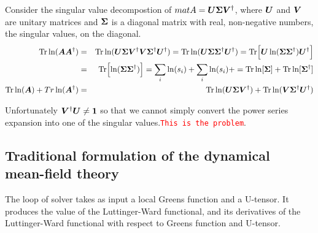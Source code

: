 \documentclass[11pt,a4paper]{report}
\newcommand{\petertt}[1]{\textcolor{red}{\texttt{#1}}}
\begin{document}
Consider the singular value decompostion of
$mat{A}=\bm{U}\bm{\Sigma}\bm{V}^\dagger$, where $\bm{U}$ and $\bm{V}$ are
unitary matrices and $\bm{\Sigma}$ is a diagonal matrix with real,
non-negative numbers, the singular values, on the diagonal.
\begin{eqnarray}
\mathrm{Tr}\ln(\bm{A}\bm{A}^\dagger)
&=&\mathrm{Tr}\ln(\bm{U}\bm{\Sigma}\bm{V}^\dagger
\bm{V}\bm{\Sigma}^\dagger\bm{U}^\dagger)
=\mathrm{Tr}\ln(\bm{U}\bm{\Sigma}\bm{\Sigma}^\dagger\bm{U}^\dagger)
=\mathrm{Tr}\Bigl[\bm{U}\ln(\bm{\Sigma}\bm{\Sigma}^\dagger)\bm{U}^\dagger\Bigr]
\nonumber\\
&=&\mathrm{Tr}\Bigl[\ln(\bm{\Sigma}\bm{\Sigma}^\dagger)\Bigr]
=\sum_i \ln(s_i)+\sum_i \ln(s_i)+
=\mathrm{Tr}\ln[\bm{\Sigma}]+\mathrm{Tr}\ln[\bm{\Sigma}^\dagger]
\nonumber\\
\mathrm{Tr}\ln(\bm{A})+Tr\ln(\bm{A}^\dagger)
&=&\mathrm{Tr}\ln(\bm{U}\bm{\Sigma}\bm{V}^\dagger)
+\mathrm{Tr}\ln(\bm{V}\bm{\Sigma}^\dagger\bm{U}^\dagger)
\end{eqnarray}

Unfortunately $\bm{V}^\dagger\bm{U}\neq\bm{1}$ so that we cannot
simply convert the power series expansion into one of the singular
values.\petertt{This is the problem}.

\subsection{Traditional formulation of the dynamical mean-field theory}
The loop of solver takes as input a local Greens function and a
U-tensor. It produces the value of the Luttinger-Ward functional, and
its derivatives of the Luttinger-Ward functional with respect to
Greens function and U-tensor.
\end{document}
